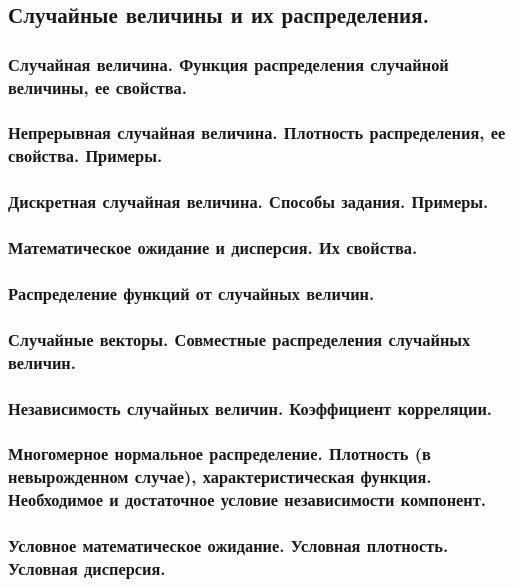 \documentclass[14pt]{extarticle}
\theoremstyle{breakstyle}
\begin{document}
\subsection{Случайные величины и их распределения.}

\subsubsection{Случайная величина. Функция распределения случайной величины, ее свойства.}

\subsubsection{Непрерывная случайная величина. Плотность распределения, ее свойства. Примеры.}

\subsubsection{Дискретная случайная величина. Способы задания. Примеры.}

\subsubsection{Математическое ожидание и дисперсия. Их свойства.}

\subsubsection{Распределение функций от случайных величин.}

\subsubsection{Случайные векторы. Совместные распределения случайных величин.}

\subsubsection{Независимость случайных величин. Коэффициент корреляции.}

\subsubsection{Многомерное нормальное распределение. Плотность (в невырожденном случае), характеристическая функция. Необходимое и достаточное условие независимости компонент.}

\subsubsection{Условное математическое ожидание. Условная плотность. Условная дисперсия.}
\end{document}
